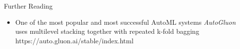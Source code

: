 \documentclass[11pt,compress,t,notes=noshow, aspectratio=169, xcolor=table]{beamer}
\begin{document}

\begin{vbframe}{Further Reading}
\begin{itemize}
    \item One of the most popular and most successful AutoML systems \textit{AutoGluon} uses multilevel stacking together with repeated k-fold bagging https://auto.gluon.ai/stable/index.html
\end{itemize}
\end{vbframe}


\endlecture
\end{document}
